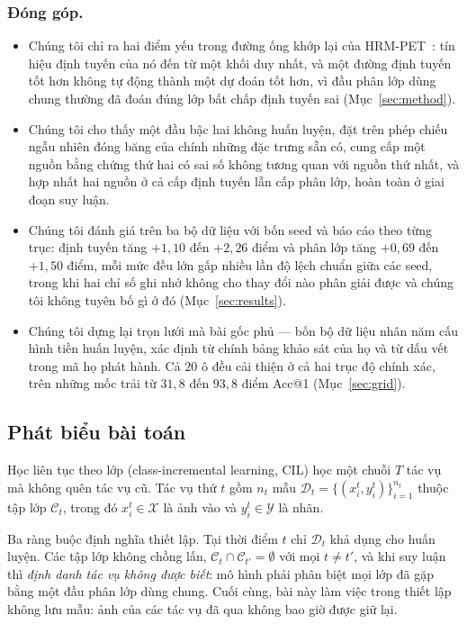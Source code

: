 \documentclass[runningheads]{llncs}
\begin{document}
\subsubsection{Đóng góp.}
\begin{itemize}
\item Chúng tôi chỉ ra hai điểm yếu trong đường ống khớp lại của
      HRM-PET~\cite{ref_hrmpet}: tín hiệu định tuyến của nó đến từ một khối duy
      nhất, và một đường định tuyến tốt hơn không tự động thành một dự đoán tốt
      hơn, vì đầu phân lớp dùng chung thường đã đoán đúng lớp bất chấp định tuyến
      sai (Mục~\ref{sec:method}).
\item Chúng tôi cho thấy một đầu bậc hai không huấn luyện, đặt trên phép chiếu
      ngẫu nhiên đóng băng của chính những đặc trưng sẵn có, cung cấp một nguồn
      bằng chứng thứ hai có sai số không tương quan với nguồn thứ nhất, và hợp
      nhất hai nguồn ở cả cấp định tuyến lẫn cấp phân lớp, hoàn toàn ở giai đoạn
      suy luận.
\item Chúng tôi đánh giá trên ba bộ dữ liệu với bốn seed và báo cáo theo từng
      trục: định tuyến tăng $+1{,}10$ đến $+2{,}26$ điểm và phân lớp tăng
      $+0{,}69$ đến $+1{,}50$ điểm, mỗi mức đều lớn gấp nhiều lần độ lệch chuẩn
      giữa các seed, trong khi hai chỉ số ghi nhớ không cho thay đổi nào phân
      giải được và chúng tôi không tuyên bố gì ở đó (Mục~\ref{sec:results}).
\item Chúng tôi dựng lại trọn lưới mà bài gốc phủ --- bốn bộ dữ liệu nhân năm cấu
      hình tiền huấn luyện, xác định từ chính bảng khảo sát của họ và từ dấu vết
      trong mã họ phát hành. Cả $20$ ô đều cải thiện ở cả hai trục độ chính xác,
      trên những mốc trải từ $31{,}8$ đến $93{,}8$ điểm Acc@1
      (Mục~\ref{sec:grid}).
\end{itemize}

\subsection{Phát biểu bài toán}

Học liên tục theo lớp (class-incremental learning, CIL) học một chuỗi $T$ tác vụ
mà không quên tác vụ cũ. Tác vụ thứ $t$ gồm $n_t$ mẫu
$\mathcal{D}_t=\{(x^t_i,y^t_i)\}_{i=1}^{n_t}$ thuộc tập lớp $\mathcal{C}_t$,
trong đó $x^t_i \in \mathcal{X}$ là ảnh vào và $y^t_i \in \mathcal{Y}$ là nhãn.

Ba ràng buộc định nghĩa thiết lập. Tại thời điểm $t$ chỉ $\mathcal{D}_t$ khả dụng
cho huấn luyện. Các tập lớp không chồng lấn,
$\mathcal{C}_t \cap \mathcal{C}_{t'} = \emptyset$ với mọi $t \neq t'$, và khi suy
luận thì \emph{định danh tác vụ không được biết}: mô hình phải phân biệt mọi lớp
đã gặp bằng một đầu phân lớp dùng chung. Cuối cùng, bài này làm việc trong thiết
lập không lưu mẫu: ảnh của các tác vụ đã qua không bao giờ được giữ lại.
\end{document}
